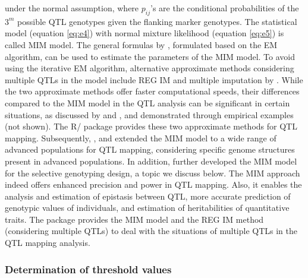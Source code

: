 \noindent under the normal assumption, where $p_{ij}$’s are the conditional probabilities of the $3^{m}$ possible QTL genotypes given the flanking marker genotypes. The statistical model (equation \ref{eq:e4}) with normal mixture likelihood (equation \ref{eq:e5}) is called MIM model. The general formulas by \citet{Kao-1997}, formulated based on the EM algorithm, can be used to estimate the parameters of the MIM model. To avoid using the iterative EM algorithm, alternative approximate methods considering multiple QTLs in the model include REG IM \citep{Haley-1992} and multiple imputation by \citet{Sen-2001}. While the two approximate methods offer faster computational speeds, their differences compared to the MIM model in the QTL analysis can be significant in certain situations, as discussed by \citet{Kao-2000} and \citet{Sen-2001}, and demonstrated through empirical examples (not shown). The R/ package provides these two approximate methods for QTL mapping. Subsequently, \citet{Kao-2004}, \citet{Kao-2006} and \citet{Kao-2009} extended the MIM model to a wide range of advanced populations for QTL mapping, considering specific genome structures present in advanced populations. In addition, \citet{Lee-2014} further developed the MIM model for the selective genotyping design, a topic we discuss below. The MIM approach indeed offers enhanced precision and power in QTL mapping. Also, it enables the analysis and estimation of epistasis between QTL, more accurate prediction of genotypic values of individuals, and estimation of heritabilities of quantitative traits. The  package provides the MIM model and the REG IM method (considering multiple QTLs) to deal with the situations of multiple QTLs in the QTL mapping analysis.

\subsubsection{Determination of threshold values}


